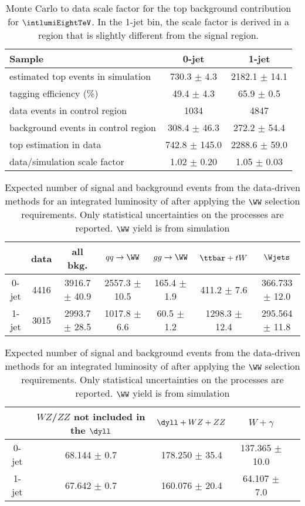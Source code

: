 \begin{table}[ht!]
\begin{center}
\begin{tabular}{l c c}
\hline
                             Sample & 0-jet           	& 1-jet           	   	\\
\hline
estimated top events in simulation  & 730.3 $\pm$   4.3 & 2182.1 $\pm$  14.1    \\
tagging efficiency     (\%)         & 49.4 $\pm$  4.3   & 65.9 $\pm$  0.5       \\ 
data events in control region       & 1034              & 4847                  \\ 
background events in control region & 308.4 $\pm$  46.3 & 272.2 $\pm$  54.4     \\ 
top estimation in data              & 742.8 $\pm$ 145.0 & 2288.6 $\pm$  59.0    \\
data/simulation scale factor        & 1.02 $\pm$  0.20  & 1.05 $\pm$  0.03      \\
\hline

\hline
\end{tabular}
\caption{Monte Carlo to data scale factor for the top background contribution for $\intlumiEightTeV$. 
In the 1-jet bin, the scale factor is derived in a region that is slightly different from the signal region.}
\label{tab:ttbar_est}
\end{center}
\end{table}

\begin{table}[ht!]
  \begin{center}
 {\small
  \begin{tabular} {|c|c|c|c|c|c|c|}
\hline
          &   data & all bkg. & $qq \to \WW$ & $gg \to \WW$ &  $\ttbar+tW$   & $\Wjets$    \\
  \hline
  \hline
	0-jet	&   4416 & 3916.7 $\pm$ 40.9 &   2557.3 $\pm$ 10.5 & 165.4 $\pm$  1.9 &  411.2 $\pm$  7.6  & 366.733 $\pm$ 12.0  \\	 
	1-jet	&   3015 & 2993.7 $\pm$ 28.5 &   1017.8 $\pm$  6.6 &  60.5 $\pm$  1.2 & 1298.3 $\pm$ 12.4  & 295.564 $\pm$ 11.8  \\   
 \hline
 \hline
  \end{tabular}
  \begin{tabular} {|c|c|c|c|c|}
\hline
       & $WZ$/$ZZ$ not included in the $\dyll$ & $\dyll+WZ+ZZ$ & $W+\gamma$ \\
  \hline
  \hline
	0-jet 	& 68.144 $\pm$  0.7 & 178.250 $\pm$ 35.4 & 137.365 $\pm$ 10.0 \\ 
	1-jet 	& 67.642 $\pm$  0.7 & 160.076 $\pm$ 20.4 &  64.107 $\pm$  7.0 \\
 \hline
 \hline
  \end{tabular}
  }
  \caption{Expected number of signal and background events from the data-driven methods for 
  an integrated luminosity of \intlumiEightTeV after applying the $\WW$ selection requirements. 
  Only statistical uncertainties on the processes are reported.
  $\WW$ yield is from simulation}
   \label{tab:wwselection_all_dymva}
  \end{center}
\end{table}

